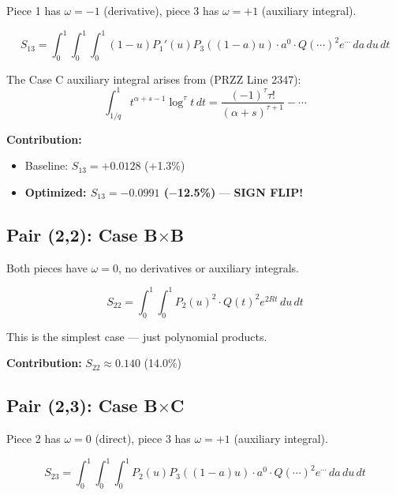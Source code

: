 \documentclass[11pt]{article}
\begin{document}
Piece 1 has $\omega = -1$ (derivative), piece 3 has $\omega = +1$ (auxiliary integral).

\begin{equation}
S_{13} = \int_0^1 \int_0^1 \int_0^1 (1-u) P_1'(u) P_3((1-a)u) \cdot a^0 \cdot Q(\cdots)^2 e^{\cdots} \, da\, du\, dt
\end{equation}

The Case C auxiliary integral arises from (PRZZ Line 2347):
\begin{equation}
\int_{1/q}^1 t^{\alpha+s-1} \log^\tau t \, dt = \frac{(-1)^\tau \tau!}{(\alpha+s)^{\tau+1}} - \cdots
\end{equation}

\textbf{Contribution:}
\begin{itemize}
\item Baseline: $S_{13} = +0.0128$ (+1.3\%)
\item \textbf{Optimized: $S_{13} = -0.0991$ ($-$12.5\%)} --- \textbf{SIGN FLIP!}
\end{itemize}

\subsection{Pair (2,2): Case B$\times$B}

Both pieces have $\omega = 0$, no derivatives or auxiliary integrals.

\begin{equation}
S_{22} = \int_0^1 \int_0^1 P_2(u)^2 \cdot Q(t)^2 e^{2Rt} \, du\, dt
\end{equation}

This is the simplest case --- just polynomial products.

\textbf{Contribution:} $S_{22} \approx 0.140$ (14.0\%)

\subsection{Pair (2,3): Case B$\times$C}

Piece 2 has $\omega = 0$ (direct), piece 3 has $\omega = +1$ (auxiliary integral).

\begin{equation}
S_{23} = \int_0^1 \int_0^1 \int_0^1 P_2(u) P_3((1-a)u) \cdot a^0 \cdot Q(\cdots)^2 e^{\cdots} \, da\, du\, dt
\end{equation}
\end{document}
